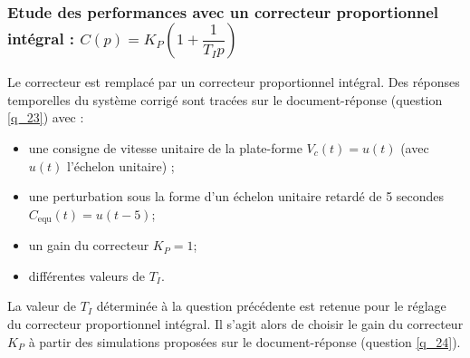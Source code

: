 \ifprof
\begin{corrige}
\end{corrige}
\else
\fi



\subsubsection{Etude des performances avec un correcteur proportionnel intégral : $C(p)={K_P}\left(1+\dfrac{1}{T_I p}\right)$}

Le correcteur est remplacé par un correcteur proportionnel intégral. Des réponses temporelles du système corrigé sont tracées sur le document-réponse (question \ref{q_23}) avec :
\begin{itemize}
\item une consigne de vitesse unitaire de la plate-forme $V_c (t)= u(t)$ (avec $u(t)$ l’échelon unitaire) ;
\item une perturbation sous la forme d’un échelon unitaire retardé de 5 secondes $C_{\text{equ}} (t) = u(t - 5)$;
\item un gain du correcteur $K_P = 1$;
\item différentes valeurs de $T_I$.
\end{itemize}

\ifprof
\begin{corrige}
\end{corrige}
\else
\fi


La valeur de $T_I$ déterminée à la question précédente est retenue pour le réglage du correcteur proportionnel intégral. Il s’agit alors de choisir le gain du correcteur $K_P$ à partir des simulations proposées sur le document-réponse (question \ref{q_24}).

\ifprof
\begin{corrige}
\end{corrige}
\else
\fi


